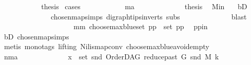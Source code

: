 \begin{isabellebody}
\ \ \ \ \ \ \ \ \isamarkupfalse%
\ \isamarkupfalse%
\ {\isacharquery}{\kern0pt}thesis\ \isamarkupfalse%
{\isacharparenleft}{\kern0pt}cases{\isacharparenright}{\kern0pt}\isanewline
\ \ \ \ \ \ \ \ \ \ \isamarkupfalse%
\ ma\isanewline
\ \ \ \ \ \ \ \ \ \ \isamarkupfalse%
\ \isamarkupfalse%
\ {\isacharquery}{\kern0pt}thesis\ \isamarkupfalse%
\ M{\isacharunderscore}{\kern0pt}in\ \ \isamarkupfalse%
\ bD\ \isanewline
\ \ \ \ \ \ \ \ \ \ \ \ \ \ chosen{\isacharunderscore}{\kern0pt}map{\isacharunderscore}{\kern0pt}simps{\isacharparenleft}{\kern0pt}{}{\isacharparenright}{\kern0pt}\ digraph{\isachardot}{\kern0pt}tips{\isacharunderscore}{\kern0pt}in{\isacharunderscore}{\kern0pt}verts\ subs\isanewline
\ \ \ \ \ \ \ \ \ \ \ \ \isamarkupfalse%
\ blast\ \isanewline
\ \ \ \ \ \ \ \ \isamarkupfalse%
\isanewline
\ \ \ \ \ \ \ \ \ \ \isamarkupfalse%
\ mm{\isacharcolon}{\kern0pt}\ {\isachardoublequoteopen}choose{\isacharunderscore}{\kern0pt}max{\isacharunderscore}{\kern0pt}blue{\isacharunderscore}{\kern0pt}set\ pp\ {\isasymin}\ set\ pp{\isachardoublequoteclose}\ \isamarkupfalse%
\ pp{\isacharunderscore}{\kern0pt}in\ \isamarkupfalse%
\ bD\ chosen{\isacharunderscore}{\kern0pt}map{\isacharunderscore}{\kern0pt}simps{\isacharparenleft}{\kern0pt}{}{\isacharparenright}{\kern0pt}\isanewline
\ \ \ \ \ \ \ \ \ \ \ \ \isamarkupfalse%
\ {\isacharparenleft}{\kern0pt}metis\ {\isacharparenleft}{\kern0pt}mono{\isacharunderscore}{\kern0pt}tags{\isacharcomma}{\kern0pt}\ lifting{\isacharparenright}{\kern0pt}\ Nil{\isacharunderscore}{\kern0pt}is{\isacharunderscore}{\kern0pt}map{\isacharunderscore}{\kern0pt}conv\ choose{\isacharunderscore}{\kern0pt}max{\isacharunderscore}{\kern0pt}blue{\isacharunderscore}{\kern0pt}avoid{\isacharunderscore}{\kern0pt}empty{\isacharparenright}{\kern0pt}\ \ \ \isanewline
\ \ \ \ \ \ \ \ \ \ \isamarkupfalse%
\ nma\isanewline
\ \ \ \ \ \ \ \ \ \ \isamarkupfalse%
\ \isamarkupfalse%
\ {\isachardoublequoteopen}x\ {\isasymin}\ set\ {\isacharparenleft}{\kern0pt}snd\ {\isacharparenleft}{\kern0pt}OrderDAG\ {\isacharparenleft}{\kern0pt}reduce{\isacharunderscore}{\kern0pt}past\ G\ {\isacharparenleft}{\kern0pt}snd\ M{\isacharparenright}{\kern0pt}{\isacharparenright}{\kern0pt}\ k{\isacharparenright}{\kern0pt}{\isacharparenright}{\kern0pt}{\isachardoublequoteclose}\ \isanewline

\end{isabellebody}
